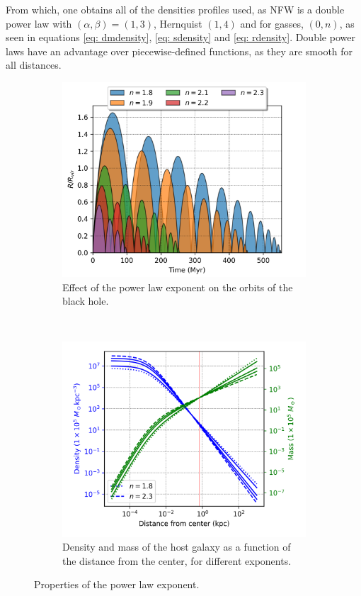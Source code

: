 		From which, one obtains all of the densities profiles used, as NFW is a double power law with $(\alpha, \beta) = (1, 3)$, Hernquist $(1, 4)$ and for gasses, $(0, n)$, as seen in equations \ref{eq: dmdensity}, \ref{eq: sdensity} and \ref{eq: rdensity}. Double power laws have an advantage over piecewise-defined functions, as they are smooth for all distances. 
		\begin{figure}[h]
			\centering
			\begin{subfigure}[t]{0.49\textwidth}
				\includegraphics[width = \textwidth]{"../Files/Week 6/power_law"}
				\caption{Effect of the power law exponent on the orbits of the black hole.}
				\label{fig: powerLawOrbits}
			\end{subfigure}
			~ 
			\begin{subfigure}[t]{0.49\textwidth}
				\includegraphics[width=\textwidth]{"../Files/Week 6/power_law_density"}
				\caption{Density and mass of the host galaxy as a function of the distance from the center, for different exponents.}
				\label{fig: powerLawDensities}
			\end{subfigure}
			\caption{Properties of the power law exponent.}
			\label{fig: powerLaw}
		\end{figure}
	

